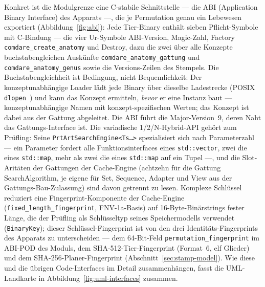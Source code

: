 \begin{nurlang}
Konkret ist die Modulgrenze eine C-stabile Schnittstelle --- die ABI (Application Binary Interface) des
Apparats ---, die je Permutation genau ein Lebewesen exportiert (Abbildung~\ref{fig:abi}): Jede Tier-Binary
enthält sieben Pflicht-Symbole mit C-Bindung --- die vier Ur-Symbole ABI-Version, Magic-Zahl, Factory
\texttt{comdare\_\allowbreak{}create\_\allowbreak{}anatomy} und Destroy, dazu die zwei über alle Konzepte
buchstabengleichen Auskünfte \texttt{comdare\_\allowbreak{}anatomy\_\allowbreak{}gattung} und
\texttt{comdare\_\allowbreak{}anatomy\_\allowbreak{}genus} sowie die Versions-Zeilen des Stempels. Die
Buchstabengleichheit ist Bedingung, nicht Bequemlichkeit: Der konzeptunabhängige Loader lädt jede Binary
über dieselbe Ladestrecke (POSIX \texttt{dlopen}~\cite{posix_dlopen}) und kann das Konzept ermitteln,
\emph{bevor} er eine Instanz baut --- konzeptunabhängige Namen mit konzept-spezifischen Werten; das
Konzept ist dabei aus der Gattung abgeleitet. Die ABI führt die Major-Version~9, deren Naht das
Gattungs-Interface ist. Die variadische 1/2/N-Hybrid-API gehört zum Prüfling: Seine
\texttt{PrtArtSearchEngine<Ts\ldots>} spezialisiert sich nach Parameterzahl --- ein Parameter fordert alle
Funktionsinterfaces eines \texttt{std::vector}, zwei die eines \texttt{std::map}, mehr als zwei die eines
\texttt{std::map} auf ein Tupel ---, und die Slot-Aritäten der Gattungen der Cache-Engine (achtzehn für die
Gattung SearchAlgorithm, je eigene für Set, Sequence, Adapter und View aus der Gattungs-Bau-Zulassung) sind
davon getrennt zu lesen. Komplexe Schlüssel reduziert eine Fingerprint-Komponente der Cache-Engine
(\texttt{fixed\_\allowbreak{}length\_\allowbreak{}fingerprint}, FNV-1a-Basis) auf 16-Byte-Binärstrings
fester Länge, die der Prüfling als Schlüsseltyp seines Speichermodells verwendet (\texttt{BinaryKey});
dieser Schlüssel-Fingerprint ist von den drei Identitäts-Fingerprints des Apparats zu unterscheiden ---
dem 64-Bit-Feld \texttt{permutation\_\allowbreak{}fingerprint} im ABI-POD des Moduls, dem
SHA-512-Tier-Fingerprint (Format~6, elf Glieder) und dem SHA-256-Planer-Fingerprint
(Abschnitt~\ref{sec:stamp-model}). Wie diese und die übrigen Code-Interfaces im Detail zusammenhängen,
fasst die UML-Landkarte in Abbildung~\ref{fig:uml-interfaces} zusammen.
\end{nurlang}
